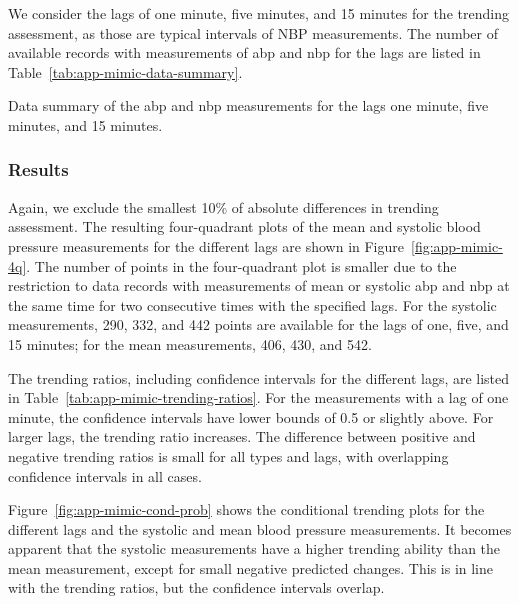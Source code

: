 We consider the lags of one minute, five minutes, and 15 minutes for the trending assessment, as those are typical intervals of NBP measurements.
The number of available records with measurements of \ac{abp} and \ac{nbp} for the lags are listed in Table~\ref{tab:app-mimic-data-summary}.

\begin{table}
    \centering
    \caption{Data summary of the \ac{abp} and \ac{nbp} measurements for the lags one minute, five minutes, and 15 minutes.}
    \label{tab:app-mimic-data-summary}
\end{table}

\subsubsection*{Results}

Again, we exclude the smallest 10\% of absolute differences in trending assessment.
The resulting four-quadrant plots of the mean and systolic blood pressure measurements for the different lags are shown in Figure~\ref{fig:app-mimic-4q}.
The number of points in the four-quadrant plot is smaller due to the restriction to data records with measurements of mean or systolic \ac{abp} and \ac{nbp} at the same time for two consecutive times with the specified lags.
For the systolic measurements, 290, 332, and 442 points are available for the lags of one, five, and 15 minutes; for the mean measurements, 406, 430, and 542.

The trending ratios, including confidence intervals for the different lags, are listed in Table~\ref{tab:app-mimic-trending-ratios}.
For the measurements with a lag of one minute, the confidence intervals have lower bounds of 0.5 or slightly above.
For larger lags, the trending ratio increases.
The difference between positive and negative trending ratios is small for all types and lags, with overlapping confidence intervals in all cases.

Figure~\ref{fig:app-mimic-cond-prob} shows the conditional trending plots for the different lags and the systolic and mean blood pressure measurements.
It becomes apparent that the systolic measurements have a higher trending ability than the mean measurement, except for small negative predicted changes.
This is in line with the trending ratios, but the confidence intervals overlap.


